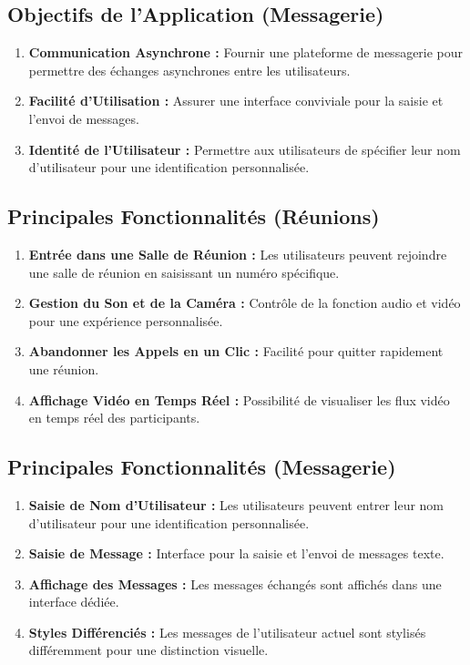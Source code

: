 \documentclass[12pt, a4paper, oneside]{thesis}
\begin{document}
\subsection{Objectifs de l'Application (Messagerie)}
\begin{enumerate}
    \item \textbf{Communication Asynchrone :} Fournir une plateforme de messagerie pour permettre des échanges asynchrones entre les utilisateurs.
    \item \textbf{Facilité d'Utilisation :} Assurer une interface conviviale pour la saisie et l'envoi de messages.
    \item \textbf{Identité de l'Utilisateur :} Permettre aux utilisateurs de spécifier leur nom d'utilisateur pour une identification personnalisée.
\end{enumerate}

\subsection{Principales Fonctionnalités (Réunions)}
\begin{enumerate}
    \item \textbf{Entrée dans une Salle de Réunion :} Les utilisateurs peuvent rejoindre une salle de réunion en saisissant un numéro spécifique.
    \item \textbf{Gestion du Son et de la Caméra :} Contrôle de la fonction audio et vidéo pour une expérience personnalisée.
    \item \textbf{Abandonner les Appels en un Clic :} Facilité pour quitter rapidement une réunion.
    \item \textbf{Affichage Vidéo en Temps Réel :} Possibilité de visualiser les flux vidéo en temps réel des participants.
\end{enumerate}

\subsection{Principales Fonctionnalités (Messagerie)}
\begin{enumerate}
    \item \textbf{Saisie de Nom d'Utilisateur :} Les utilisateurs peuvent entrer leur nom d'utilisateur pour une identification personnalisée.
    \item \textbf{Saisie de Message :} Interface pour la saisie et l'envoi de messages texte.
    \item \textbf{Affichage des Messages :} Les messages échangés sont affichés dans une interface dédiée.
    \item \textbf{Styles Différenciés :} Les messages de l'utilisateur actuel sont stylisés différemment pour une distinction visuelle.
\end{enumerate}
\end{document}
